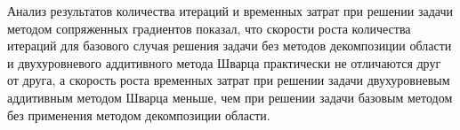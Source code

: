 \documentclass[a4paper]{article}
\begin{document}
Анализ результатов количества итераций и временных затрат при решении задачи методом сопряженных градиентов показал, что скорости роста количества итераций для базового случая решения задачи без методов декомпозиции области и двухуровневого аддитивного метода Шварца практически не отличаются друг от друга, а скорость роста временных затрат при решении задачи двухуровневым аддитивным методом Шварца меньше, чем при решении задачи базовым методом без применения методом декомпозиции области.
\end{document}
